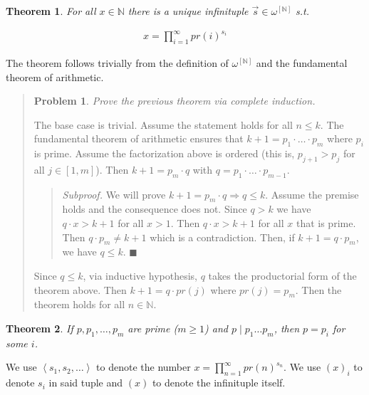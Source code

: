 \documentclass[a4paper, 12pt]{article}
\newtheorem{problem}{Problem}
\newtheorem{theorem}{Theorem}
\newtheorem{problem}{Problem}
\newtheorem{theorem}{Theorem}
\begin{document}
\begin{theorem}
    For all $x \in \mathbb{N}$ there is a unique infinituple $\overrightarrow{s}
    \in \omega^{[\mathbb{N}]}$ s.t. 

    \begin{align*}
        x = \prod_{i=1}^{\infty} pr(i)^{s_i}
    \end{align*}
\end{theorem}

The theorem follows trivially from the definition of $\omega^{[\mathbb{N}]}$ and
the fundamental theorem of arithmetic. 


\small
\begin{quote}

\begin{problem}
    Prove the previous theorem via complete induction.
\end{problem}

The base case is trivial. Assume the statement holds for all $n \leq k$. The
fundamental theorem of arithmetic ensures that $k + 1 = p_1 \cdot \ldots \cdot
p_m$ where $p_i$ is prime. Assume the factorization above is ordered (this is,
$p_{j + 1} > p_j$ for all $j \in [1, m]$). Then $k + 1 = p_m \cdot q$ with $q =
p_1 \cdot \ldots \cdot p_{m - 1}$. 

\footnotesize
\begin{quote}
    \textit{Subproof.} We will prove $k + 1 = p_m \cdot q \Rightarrow q \leq k$.
    Assume the premise holds and the consequence does not. Since $q > k$ we have
    $q \cdot x > k + 1$ for all $x > 1$. Then $q \cdot x > k + 1$ for all $x$
    that is prime. Then $q \cdot p_m \neq k + 1$ which is a contradiction. Then,
    if $k + 1 = q \cdot p_m$, we have $q \leq k$. $\blacksquare$
\end{quote}
\small

Since $q \leq k$, via inductive hypothesis, $q$ takes the productorial form of
the theorem above. Then $k + 1 = q \cdot pr(j)$ where $pr(j) = p_m$. Then the
theorem holds for all $n \in \mathbb{N}$.

\end{quote}
\normalsize


\begin{theorem}
    If $p, p_1, \ldots, p_m$ are prime ($m \geq 1$) and $p \mid p_1 \ldots p_m$,
    then $p = p_i$ for some $i$.
\end{theorem}

We use $\left\langle  s_1, s_2, \ldots  \right\rangle$ to denote the number $x =
\prod_{n=1}^{\infty} pr(n)^{s_n}$. We use $(x)_i$ to denote $s_i$ in said tuple
and $(x)$ to denote the infinituple itself.
\end{document}
